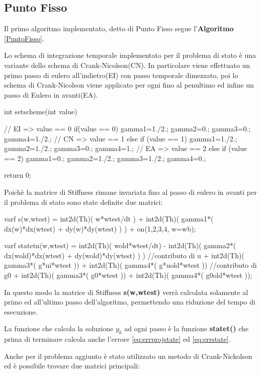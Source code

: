 \subsection{Punto Fisso}
Il primo algoritmo implementato, detto di Punto Fisso segue l'\textbf{Algoritmo} \ref{PuntoFisso}.
\par
Lo schema di integrazione temporale implementato per il problema di stato è una variante dello schema di Crank-Nicolson(CN). In particolare viene effettuato un primo passo di eulero all'indietro(EI) con passo temporale dimezzato, poi lo schema di Crank-Nicolson viene applicato per ogni fino al penultimo ed infine un passo di Eulero in avanti(EA).
\begin{Code}[caption={Funzione \texttt{setscheme()}}]
int setscheme(int value)
{
	// EI => value == 0
	if(value == 0)
	{
	    gamma1=1./2.;
	    gamma2=0.;
	    gamma3=0.;
	    gamma4=1./2.;
	}
	// CN => value == 1
	else if (value == 1)
	{	
		gamma1=1./2.;
	    gamma2=1./2.;
	    gamma3=0.;
	    gamma4=1.;
	}
	// EA => value == 2
	else if (value == 2)
	{
		gamma1=0.;
	    gamma2=1./2.;
	    gamma3=1./2.;
	    gamma4=0.;
	}
	
	return 0;
}
\end{Code}
Poichè la matrice di Stiffness rimane invariata fino al passo di eulero in avanti per il problema di stato sono state definite due matrici:
\begin{Code}[caption={Matrici \texttt{s(w,wtest)} e \texttt{statetn(w,wtest)}}]
varf s(w,wtest) =   int2d(Th)( w*wtest/dt )
	        	  + int2d(Th)( gamma1*( dx(w)*dx(wtest) + dy(w)*dy(wtest) ) )
				  + on(1,2,3,4, w=wb);

varf statetn(w,wtest) =   int2d(Th)( wold*wtest/dt)
				  		- int2d(Th)( gamma2*( dx(wold)*dx(wtest) + dy(wold)*dy(wtest) ) )
							//contributo di u
						+ int2d(Th)( gamma3*( g*ui*wtest ))
				 		+ int2d(Th)( gamma4*( g*uold*wtest ))
							//contributo di g0
						+ int2d(Th)( gamma3*( g0*wtest ))
				 		+ int2d(Th)( gamma4*( g0old*wtest ));
\end{Code}
In questo modo la matrice di Stiffness \textbf{s(w,wtest)} verrà calcolata solamente al primo ed all'ultimo passo dell'algoritmo, permettendo una riduzione del tempo di esecuzione.
\par
La funzione che calcola la soluzione $y_k$ ad ogni passo è la funzione \textbf{statet()} che prima di terminare calcola anche l'errore \eqref{eq:errprojstate} ed \eqref{eq:errstate}.
\par
Anche per il problema aggiunto è stato utilizzato un metodo di Crank-Nickolson ed è possibile trovare due matrici principali:
